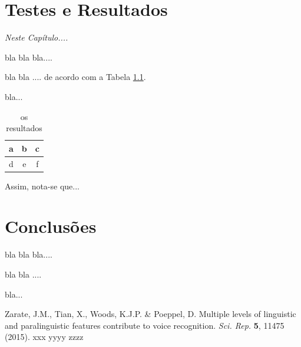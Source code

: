 \documentclass[a4paper,12pt,openright,oneside]{book}
\newenvironment{myenv}[1]
  {\begin{spacing}{#1}}
  {\end{spacing}}
\begin{document}
\chapter{Testes e Resultados}
\label{c_tr}
\textit{Neste Cap\'{i}tulo....}
\begin{myenv}{1.5}
\par bla bla bla....
\\
\par bla bla ....  de acordo com a Tabela \ref{t_res}.
\\
\par bla... 
\begin{table}
\centering
\caption{os resultados}
\vspace*{+10pt}
\begin{tabular}{|c|c|c|}
\hline
a & b & c \\
\hline
d & e & f \\
\hline
\end{tabular}
\label{t_res}
\end{table}
\par Assim, nota-se que... 
\end{myenv}
\chapter{Conclus\~{o}es}
\label{c_c}
\begin{myenv}{1.5}
\par bla bla bla....
\\
\par bla bla ....
\\
\par bla...

\end{myenv}
\begin{thebibliography}{1}
Zarate, J.M., Tian, X., Woods, K.J.P. \& Poeppel, D. Multiple levels of linguistic and paralinguistic features contribute to voice recognition. \textit{Sci. Rep.} \textbf{5}, 11475 (2015).
xxx yyyy zzzz
\end{thebibliography}
\end{document}
